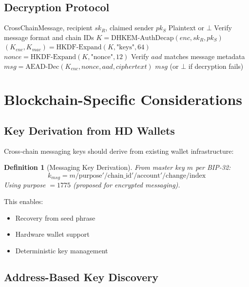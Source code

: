\documentclass[11pt,a4paper]{article}
\newtheorem{definition}[theorem]{Definition}
\begin{document}
\subsection{Decryption Protocol}

\begin{algorithm}
\caption{DecryptCrossChainMessage}
\begin{algorithmic}[1]
\Require CrossChainMessage, recipient $sk_R$, claimed sender $pk_S$
\Ensure Plaintext or $\bot$
\State Verify message format and chain IDs
\State $K = \text{DHKEM-AuthDecap}(enc, sk_R, pk_S)$
\State $(K_{enc}, K_{mac}) = \text{HKDF-Expand}(K, \text{"keys"}, 64)$
\State $nonce = \text{HKDF-Expand}(K, \text{"nonce"}, 12)$
\State Verify $aad$ matches message metadata
\State $msg = \text{AEAD-Dec}(K_{enc}, nonce, aad, ciphertext)$
\State \Return $msg$ (or $\bot$ if decryption fails)
\end{algorithmic}
\end{algorithm}

\section{Blockchain-Specific Considerations}

\subsection{Key Derivation from HD Wallets}

Cross-chain messaging keys should derive from existing wallet infrastructure:

\begin{definition}[Messaging Key Derivation]
From master key $m$ per BIP-32:
\[
k_{msg} = m / \text{purpose}' / \text{chain\_id}' / \text{account}' / \text{change} / \text{index}
\]
Using purpose $= 1775$ (proposed for encrypted messaging).
\end{definition}

This enables:
\begin{itemize}
    \item Recovery from seed phrase
    \item Hardware wallet support
    \item Deterministic key management
\end{itemize}

\subsection{Address-Based Key Discovery}
\end{document}

